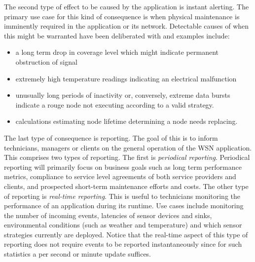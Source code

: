 The second type of effect to be caused by the application is instant alerting. The primary use case for this kind of consequence is when physical maintenance is imminently required in the application or its network. Detectable causes of when this might be warranted have been deliberated with \idsystems and examples include:
\begin{itemize}
\nospace
\item a long term drop in coverage level which might indicate permanent obstruction of signal
\item extremely high temperature readings indicating an electrical malfunction
\item unusually long periods of inactivity or, conversely, extreme data bursts indicate a rouge node not executing according to a valid strategy.
\item calculations estimating node lifetime determining a node needs replacing.
\end{itemize}

The last type of consequence is reporting. The goal of this is to inform technicians, managers or clients on the general operation of the WSN application. This comprises two types of reporting. The first is \emph{periodical reporting}. Periodical reporting will primarily focus on business goals such as long term performance metrics, compliance to service level agreements of both service providers and clients, and prospected short-term maintenance efforts and costs. The other type of reporting is \emph{real-time reporting}. This is useful to technicians monitoring the performance of an application during its runtime. Use cases include monitoring the number of incoming events, latencies of sensor devices and sinks, environmental conditions (such as weather and temperature) and which sensor strategies currently are deployed. Notice that the real-time aspect of this type of reporting does not require events to be reported instantaneously since for such statistics a per second or minute update suffices.


